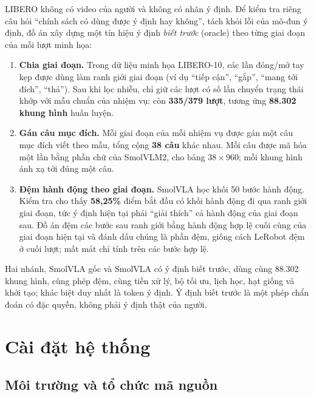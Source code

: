 \documentclass[a4paper,oneside]{report}
\begin{document}
LIBERO \citep{liu2023libero} không có video của người và không có nhãn ý định. Để kiểm tra riêng câu hỏi ``chính sách có dùng được ý định hay không'', tách khỏi lỗi của mô-đun ý định, đồ án xây dựng một tín hiệu ý định \textit{biết trước} (oracle) theo từng giai đoạn của mỗi lượt minh họa:
\begin{enumerate}
  \item \textbf{Chia giai đoạn.} Trong dữ liệu minh họa LIBERO-10, các lần đóng/mở tay kẹp được dùng làm ranh giới giai đoạn (ví dụ ``tiếp cận'', ``gắp'', ``mang tới đích'', ``thả''). Sau khi lọc nhiễu, chỉ giữ các lượt có số lần chuyển trạng thái khớp với mẫu chuẩn của nhiệm vụ: còn \textbf{335/379 lượt}, tương ứng \textbf{88.302 khung hình} huấn luyện.
  \item \textbf{Gán câu mục đích.} Mỗi giai đoạn của mỗi nhiệm vụ được gán một câu mục đích viết theo mẫu, tổng cộng \textbf{38 câu} khác nhau. Mỗi câu được mã hóa một lần bằng phần chữ của SmolVLM2, cho bảng $38\times960$; mỗi khung hình ánh xạ tới đúng một câu.
  \item \textbf{Đệm hành động theo giai đoạn.} SmolVLA học khối 50 bước hành động. Kiểm tra cho thấy \textbf{58,25\%} điểm bắt đầu có khối hành động đi qua ranh giới giai đoạn, tức ý định hiện tại phải ``giải thích'' cả hành động của giai đoạn sau. Đồ án đệm các bước sau ranh giới bằng hành động hợp lệ cuối cùng của giai đoạn hiện tại và đánh dấu chúng là phần đệm, giống cách LeRobot đệm ở cuối lượt; mất mát chỉ tính trên các bước hợp lệ.
\end{enumerate}
Hai nhánh, SmolVLA gốc và SmolVLA có ý định biết trước, dùng cùng 88.302 khung hình, cùng phép đệm, cùng tiền xử lý, bộ tối ưu, lịch học, hạt giống và khởi tạo; khác biệt duy nhất là token ý định. Ý định biết trước là một phép chẩn đoán có đặc quyền, không phải ý định thật của người.

\section{Cài đặt hệ thống}
\label{sec:impl}

\subsection{Môi trường và tổ chức mã nguồn}
\end{document}
